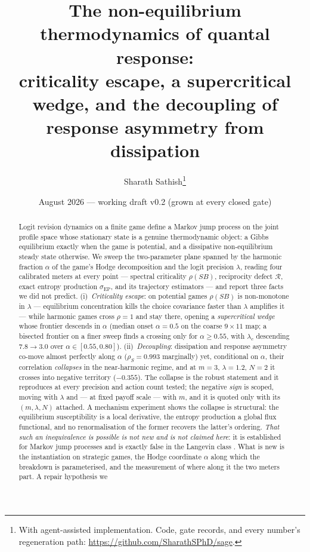 \documentclass[11pt]{article}
\title{\textbf{The non-equilibrium thermodynamics of quantal response:}\\
\large criticality escape, a supercritical wedge, and the decoupling of\\
response asymmetry from dissipation}
\author{Sharath Sathish\thanks{With agent-assisted implementation. Code, gate records, and every
number's regeneration path: \url{https://github.com/SharathSPhD/sage}.}}
\date{August 2026 --- working draft v0.2 (grown at every closed gate)}
\newcommand{\R}{\mathcal{R}}
\newcommand{\EPR}{\sigma_{\mathrm{EP}}}
\begin{document}
\maketitle

\begin{abstract}
Logit revision dynamics on a finite game define a Markov jump process on the joint
profile space whose stationary state is a genuine thermodynamic object: a Gibbs
equilibrium exactly when the game is potential, and a dissipative non-equilibrium
steady state otherwise. We sweep the two-parameter plane spanned by the harmonic
fraction $\alpha$ of the game's Hodge decomposition and the logit precision
$\lambda$, reading four calibrated meters at every point --- spectral criticality
$\rho(SB)$, reciprocity defect $\R$, exact entropy production $\EPR$, and its
trajectory estimators --- and report three facts we did not predict.
(i)~\emph{Criticality escape}: on potential games $\rho(SB)$ is non-monotone in
$\lambda$ --- equilibrium concentration kills the choice covariance faster than
$\lambda$ amplifies it --- while harmonic games cross $\rho=1$ and stay there,
opening a \emph{supercritical wedge} whose frontier descends in $\alpha$
(median onset $\alpha=0.5$ on the coarse $9\times11$ map; a bisected
frontier on a finer sweep finds a crossing only for $\alpha\ge0.55$, with
$\lambda_c$ descending $7.8\to3.0$ over $\alpha\in[0.55,0.80]$).
(ii)~\emph{Decoupling}: dissipation and response asymmetry co-move almost
perfectly along $\alpha$ ($\rho_S=0.993$ marginally) yet, conditional on
$\alpha$, their correlation \emph{collapses} in the near-harmonic regime, and
at $m=3$, $\lambda=1.2$, $N=2$ it crosses into negative territory
($-0.355$). The collapse is the robust statement and it reproduces at every
precision and action count tested; the negative \emph{sign} is scoped, moving
with $\lambda$ and --- at fixed payoff scale --- with $m$, and it is quoted
only with its $(m,\lambda,N)$ attached. A mechanism experiment shows the
collapse is structural: the equilibrium susceptibility is a local derivative,
the entropy production a global flux functional, and no renormalisation of the
former recovers the latter's ordering. \emph{That such an inequivalence is
possible is not new and is not claimed here}: it is established for Markov jump
processes \citep{baiesi2009} and is exactly false in the Langevin class
\citep{haradasasa2005}. What is new is the instantiation on strategic games,
the Hodge coordinate $\alpha$ along which the breakdown is parameterised, and
the measurement of where along it the two meters part. A repair hypothesis we

\end{abstract}
\end{document}
